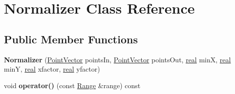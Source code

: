 \hypertarget{class_normalizer}{
\section{Normalizer Class Reference}
\label{class_normalizer}
}
\subsection*{Public Member Functions}
\begin{CompactItemize}
\item 
\hypertarget{class_normalizer_56999f560190503e8f001bdc7ecc2b87}{
\textbf{Normalizer} (\hyperlink{class_point}{PointVector} pointsIn, \hyperlink{class_point}{PointVector} pointsOut, \hyperlink{cowichan_8hpp_4d521b2c54a1f6312cc8fa04827eaf98}{real} minX, \hyperlink{cowichan_8hpp_4d521b2c54a1f6312cc8fa04827eaf98}{real} minY, \hyperlink{cowichan_8hpp_4d521b2c54a1f6312cc8fa04827eaf98}{real} xfactor, \hyperlink{cowichan_8hpp_4d521b2c54a1f6312cc8fa04827eaf98}{real} yfactor)}
\label{class_normalizer_56999f560190503e8f001bdc7ecc2b87}

\item 
\hypertarget{class_normalizer_f384e3a61919ce96f30b52248c384261}{
void \textbf{operator()} (const \hyperlink{cowichan__tbb_8hpp_8e2057f725b08f3a15513c378a453a47}{Range} \&range) const }
\label{class_normalizer_f384e3a61919ce96f30b52248c384261}

\end{CompactItemize}
